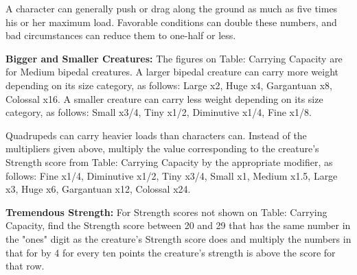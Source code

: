 A character can generally push or drag along the ground as much as five times his or her maximum load. Favorable conditions can double these numbers, and bad circumstances can reduce them to one-half or less.

\textbf{Bigger and Smaller Creatures:} The figures on Table: Carrying Capacity are for Medium bipedal creatures. A larger bipedal creature can carry more weight depending on its size category, as follows: Large x2, Huge x4, Gargantuan x8, Colossal x16. A smaller creature can carry less weight depending on its size category, as follows: Small x3/4, Tiny x1/2, Diminutive x1/4, Fine x1/8.

Quadrupeds can carry heavier loads than characters can. Instead of the multipliers given above, multiply the value corresponding to the creature's Strength score from Table: Carrying Capacity by the appropriate modifier, as follows: Fine x1/4, Diminutive x1/2, Tiny x3/4, Small x1, Medium x1.5, Large x3, Huge x6, Gargantuan x12, Colossal x24.

\textbf{Tremendous Strength:} For Strength scores not shown on Table: Carrying Capacity, find the Strength score between 20 and 29 that has the same number in the "ones" digit as the creature's Strength score does and multiply the numbers in that for by 4 for every ten points the creature's strength is above the score for that row.

